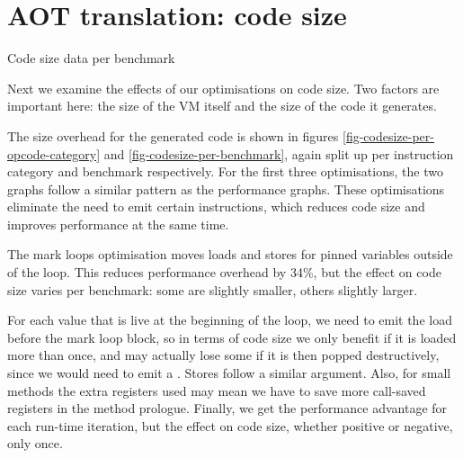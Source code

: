 \section{AOT translation: code size}
\label{sec-evaluation-aot-translation-code-size}
\begin{landscape}
\begin{table}[]
 \centering
 \caption{Code size data per benchmark}
 \label{tbl-codesize-per-benchmark}
 \small
 \scriptsize
 \setlength{\tabcolsep}{4pt}
 
 \setlength{\tabcolsep}{6pt}
\end{table}
\end{landscape}


Next we examine the effects of our optimisations on code size. Two factors are important here: the size of the VM itself and the size of the code it generates.

The size overhead for the generated code is shown in figures \ref{fig-codesize-per-opcode-category} and \ref{fig-codesize-per-benchmark}, again split up per instruction category and benchmark respectively. For the first three optimisations, the two graphs follow a similar pattern as the performance graphs. These optimisations eliminate the need to emit certain instructions, which reduces code size and improves performance at the same time.

The mark loops optimisation moves loads and stores for pinned variables outside of the loop. This reduces performance overhead by 34\%, but the effect on code size varies per benchmark: some are slightly smaller, others slightly larger.

For each value that is live at the beginning of the loop, we need to emit the load before the mark loop block, so in terms of code size we only benefit if it is loaded more than once, and may actually lose some if it is then popped destructively, since we would need to emit a . Stores follow a similar argument. Also, for small methods the extra registers used may mean we have to save more call-saved registers in the method prologue. Finally, we get the performance advantage for each run-time iteration, but the effect on code size, whether positive or negative, only once.

